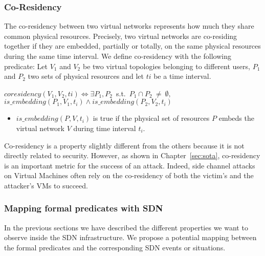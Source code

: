 \subsubsection{Co-Residency}
\label{sec:prop-cores}
The co-residency between two virtual networks represents how much they share common physical resources.
Precisely, two virtual networks are co-residing together if they are embedded, partially or totally, on the same physical resources during the same time interval.
We define co-residency with the following predicate:
Let $V_1$ and $V_2$ be two virtual topologies belonging to different users, $P_1$ and $P_2$ two sets of physical resources and let $ti$ be a time interval.
\begin{myformula}
$coresidency(V_1,V_2,ti) \Leftrightarrow \exists P_1,P_2$~s.t.~$P_1 \cap P_2~\neq~\emptyset, $\\ $is\_embedding(P_1,V_1,t_i) \wedge is\_embedding(P_2,V_2,t_i)$
\end{myformula}

\begin{itemize}
    \item $is\_embedding(P,V,t_i)$ is true if the physical set of resources $P$ embeds the virtual network $V$ during time interval $t_i$.
\end{itemize}

Co-residency is a property slightly different from the others because it is not directly related to security.
However, as shown in Chapter~\ref{sec:sota}, co-residency is an important metric for the success of an attack.
Indeed, side channel attacks on Virtual Machines often rely on the co-residency of both the victim's and the attacker's VMs to succeed.



\subsubsection{Mapping formal predicates with SDN}
\label{sec:mapping-model}
In the previous sections we have described the different properties we want to observe inside the SDN infrastructure.
We propose a potential mapping between the formal predicates and the corresponding SDN events or situations.


